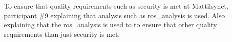 To ensure that quality requirements such as security is met at Mattilsynet, participant \#9 explaining that analysis such as \gls{ros_analysis} is used. Also explaining that the \gls{ros_analysis} is used to to ensure that other quality requirements than just security is met.









